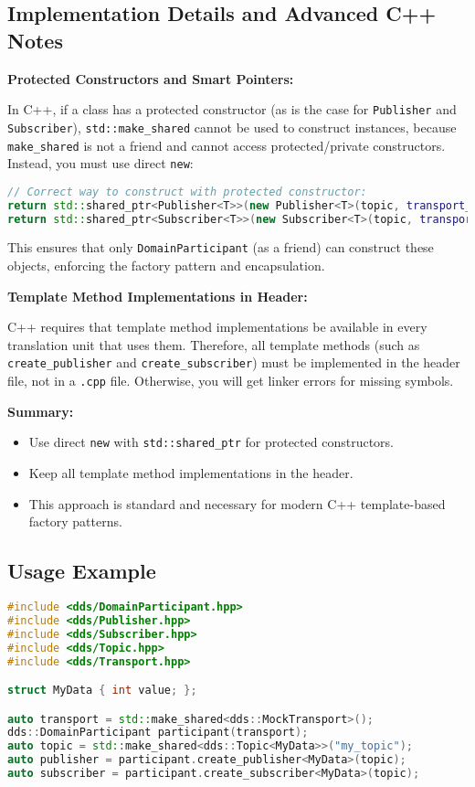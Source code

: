 \documentclass[12pt]{report}
\begin{document}
\subsection{Implementation Details and Advanced C++ Notes}
\textbf{Protected Constructors and Smart Pointers:}

In C++, if a class has a protected constructor (as is the case for \texttt{Publisher} and \texttt{Subscriber}), \texttt{std::make\_shared} cannot be used to construct instances, because \texttt{make\_shared} is not a friend and cannot access protected/private constructors. Instead, you must use direct \texttt{new}:
\begin{lstlisting}[language=C++]
// Correct way to construct with protected constructor:
return std::shared_ptr<Publisher<T>>(new Publisher<T>(topic, transport_));
return std::shared_ptr<Subscriber<T>>(new Subscriber<T>(topic, transport_));
\end{lstlisting}
This ensures that only \texttt{DomainParticipant} (as a friend) can construct these objects, enforcing the factory pattern and encapsulation.

\textbf{Template Method Implementations in Header:}

C++ requires that template method implementations be available in every translation unit that uses them. Therefore, all template methods (such as \texttt{create\_publisher} and \texttt{create\_subscriber}) must be implemented in the header file, not in a \texttt{.cpp} file. Otherwise, you will get linker errors for missing symbols.

\textbf{Summary:}
\begin{itemize}
    \item Use direct \texttt{new} with \texttt{std::shared\_ptr} for protected constructors.
    \item Keep all template method implementations in the header.
    \item This approach is standard and necessary for modern C++ template-based factory patterns.
\end{itemize}

\subsection{Usage Example}
\begin{lstlisting}[language=C++]
#include <dds/DomainParticipant.hpp>
#include <dds/Publisher.hpp>
#include <dds/Subscriber.hpp>
#include <dds/Topic.hpp>
#include <dds/Transport.hpp>

struct MyData { int value; };

auto transport = std::make_shared<dds::MockTransport>();
dds::DomainParticipant participant(transport);
auto topic = std::make_shared<dds::Topic<MyData>>("my_topic");
auto publisher = participant.create_publisher<MyData>(topic);
auto subscriber = participant.create_subscriber<MyData>(topic);
\end{lstlisting}
\end{document}
